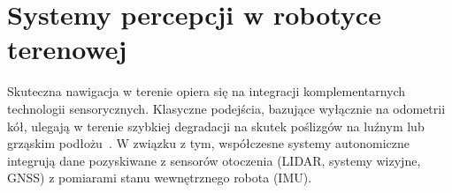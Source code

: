 \documentclass[a4paper,twoside,12pt]{book}
\begin{document}
\section{Systemy percepcji w robotyce terenowej}
Skuteczna nawigacja w terenie opiera się na integracji komplementarnych technologii sensorycznych. Klasyczne podejścia, bazujące wyłącznie na odometrii kół, ulegają w terenie szybkiej degradacji na skutek poślizgów na luźnym lub grząskim podłożu~\cite{epton2007odometry}. W związku z tym, współczesne systemy autonomiczne integrują dane pozyskiwane z sensorów otoczenia (LIDAR, systemy wizyjne, GNSS) z pomiarami stanu wewnętrznego robota (IMU).



\end{document}
